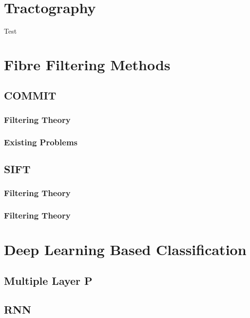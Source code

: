 \section{Tractography}

Test \autocite{dhollanderFixelbasedAnalysisDiffusion2021}


\section{Fibre Filtering Methods}

\subsection{COMMIT}

\subsubsection{Filtering Theory}

\subsubsection{Existing Problems}

\subsection{SIFT}

\subsubsection{Filtering Theory}

\subsubsection{Filtering Theory}

\section{Deep Learning Based Classification}

\subsection{Multiple Layer P}
\subsection{RNN}




